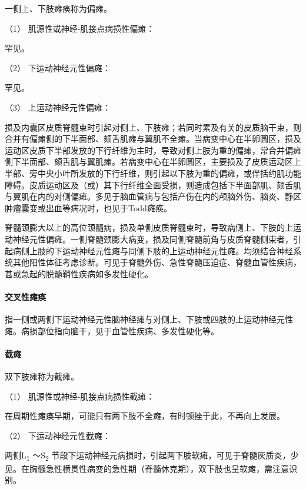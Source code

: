 一侧上、下肢瘫痪称为偏瘫。

\hypertarget{text00018.htmlux5cux23CHP1-6-2-3-5-1}{}
（1） 肌源性或神经-肌接点病损性偏瘫：

罕见。

\hypertarget{text00018.htmlux5cux23CHP1-6-2-3-5-2}{}
（2） 下运动神经元性偏瘫：

罕见。

\hypertarget{text00018.htmlux5cux23CHP1-6-2-3-5-3}{}
（3） 上运动神经元性偏瘫：

损及内囊区皮质脊髓束时引起对侧上、下肢瘫；若同时累及有关的皮质脑干束，则合并有偏瘫侧的下半面部、颏舌肌瘫与翼肌不全瘫。当病变中心在半卵圆区，损及运动区皮质下半部发放的下行纤维为主时，导致对侧上肢为重的偏瘫，常合并偏瘫侧下半面部、颏舌肌与翼肌瘫。若病变中心在半卵圆区，主要损及了皮质运动区上半部、旁中央小叶所发放的下行纤维，则引起以下肢为重的偏瘫，或伴括约肌功能障碍。皮质运动区及（或）其下行纤维全面受损，则造成包括下半面部肌、颏舌肌与翼肌在内的对侧偏瘫。多见于脑血管病与包括产伤在内的颅脑外伤、脑炎、静区肿瘤囊变或出血等病况时，也见于Todd瘫痪。

脊髓颈膨大以上的高位颈髓病，损及单侧皮质脊髓束时，导致病侧上、下肢的上运动神经元性偏瘫。一侧脊髓颈膨大病变，损及同侧脊髓前角与皮质脊髓侧束者，引起病侧上肢的下运动神经元性瘫与同侧下肢的上运动神经元性瘫。均须结合神经系统其他阳性体征考虑诊断。可见于脊髓外伤、急性脊髓压迫症、脊髓血管性疾病，甚或急起的脱髓鞘性疾病如多发性硬化。

\paragraph{交叉性瘫痪}

指一侧或两侧下运动神经元性脑神经瘫与对侧上、下肢或四肢的上运动神经元性瘫。病损部位指向脑干，见于血管性疾病、多发性硬化等。

\paragraph{截瘫}

双下肢瘫称为截瘫。

\hypertarget{text00018.htmlux5cux23CHP1-6-2-3-7-1}{}
（1） 肌源性或神经-肌接点病损性截瘫：

在周期性瘫痪早期，可能只有两下肢不全瘫，有时顿挫于此，不再向上发展。

\hypertarget{text00018.htmlux5cux23CHP1-6-2-3-7-2}{}
（2） 下运动神经元性截瘫：

两侧L\textsubscript{1} ～S\textsubscript{2}
节段下运动神经元病损时，引起两下肢软瘫，可见于脊髓灰质炎，少见。在胸髓急性横贯性病变的急性期（脊髓休克期），双下肢也呈软瘫，需注意识别。

